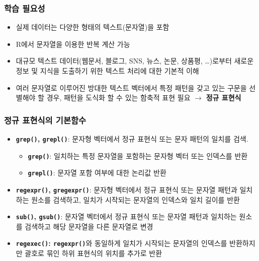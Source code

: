 \documentclass[
  11pt,
]{krantz}
\makeatletter
\providecommand{\tightlist}{%
  \setlength{\itemsep}{0pt}\setlength{\parskip}{0pt}}
\newenvironment{kframe}{%
\medskip{}
\setlength{\fboxsep}{.8em}
 \def\at@end@of@kframe{}%
 \ifinner\ifhmode%
  \def\at@end@of@kframe{\end{minipage}}%
  \begin{minipage}{\columnwidth}%
 \fi\fi%
 \def\FrameCommand##1{\hskip\@totalleftmargin \hskip-\fboxsep
 \colorbox{shadecolor}{##1}\hskip-\fboxsep
     \hskip-\linewidth \hskip-\@totalleftmargin \hskip\columnwidth}%
 \MakeFramed {\advance\hsize-\width
   \@totalleftmargin\z@ \linewidth\hsize
   \@setminipage}}%
 {\par\unskip\endMakeFramed%
 \at@end@of@kframe}
\renewenvironment{quote}{\begin{kframe}}{\end{kframe}}
\makeatother
\begin{document}
\normalsize

\hypertarget{ch03-require}{%
\subsubsection*{\texorpdfstring{\textbf{학습 필요성}}{학습 필요성}}\label{ch03-require}}


\begin{itemize}
\item
  실제 데이터는 다양한 형태의 텍스트(문자열)을 포함
\item
  R에서 문자열을 이용한 반복 계산 가능
\item
  대규모 텍스트 데이터(웹문서, 블로그, SNS, 뉴스, 논문, 상품평, \ldots)로부터 새로운 정보 및 지식을 도출하기 위한 텍스트 처리에 대한 기본적 이해
\item
  여러 문자열로 이루어진 방대한 텍스트 벡터에서 특정 패턴을 갖고 있는 구문을 선별해야 할 경우, 패턴을 도식화 할 수 있는 함축적 표현 필요 \(\rightarrow\) \textbf{정규 표현식}
\end{itemize}

\hypertarget{regex-prim-fun}{%
\subsubsection*{\texorpdfstring{\textbf{정규 표현식의 기본함수}}{정규 표현식의 기본함수}}\label{regex-prim-fun}}


\begin{quote}
\begin{itemize}
\item
  \textbf{\texttt{grep()}, \texttt{grepl()}}: 문자형 벡터에서 정규 표현식 또는 문자 패턴의 일치를 검색.

  \begin{itemize}
  \tightlist
  \item
    \textbf{\texttt{grep()}}: 일치하는 특정 문자열을 포함하는 문자형 벡터 또는 인덱스를 반환
  \item
    \textbf{\texttt{grepl()}}: 문자열 포함 여부에 대한 논리값 반환\\
  \end{itemize}
\item
  \textbf{\texttt{regexpr()}, \texttt{gregexpr()}}: 문자형 벡터에서 정규 표현식 또는 문자열 패턴과 일치하는 원소를 검색하고, 일치가 시작되는 문자열의 인덱스와 일치 길이를 반환
\item
  \textbf{\texttt{sub()}, \texttt{gsub()}}: 문자열 벡터에서 정규 표현식 또는 문자열 패턴과 일치하는 원소를 검색하고 해당 문자열을 다른 문자열로 변경
\item
  \textbf{\texttt{regexec()}: \texttt{regexpr()}}와 동일하게 일치가 시작되는 문자열의 인덱스를 반환하지만 괄호로 묶인 하위 표현식의 위치를 추가로 반환
\end{itemize}
\end{quote}
\end{document}
